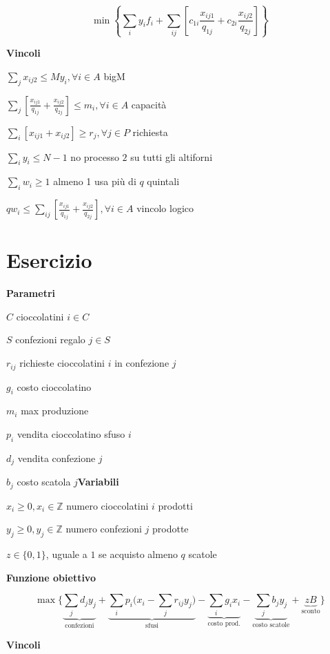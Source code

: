 \documentclass[10pt,a4paper,twoside,openright]{book}
\newcounter{es}
\newcommand{\Es}{
	\stepcounter{es}
	\section{Esercizio \arabic{es}}
	}
\newcommand{\Par}{\textbf{Parametri}}
\newcommand{\Var}{\textbf{Variabili}}
\newcommand{\Fob}{\textbf{Funzione obiettivo}}
\newcommand{\Vin}{\textbf{Vincoli}}
\begin{document}
\begin{equation*}
	\min \left\{\sum _{i} y_{i} f_{i} +\sum _{ij}\left[ c_{1i}\frac{x_{ij1}}{q_{1j}} +c_{2i}\frac{x_{ij2}}{q_{2j}}\right]\right\}
\end{equation*}

\Vin

$\sum _{j} x_{ij2} \leq My_{i} ,\forall i\in A$ bigM

$\sum _{j}\left[\frac{x_{ij1}}{q_{1j}} +\frac{x_{ij2}}{q_{2j}}\right] \leq m_{i} ,\forall i\in A$ capacità

$\sum _{i}[ x_{ij1} +x_{ij2}] \geqslant r_{j} ,\forall j\in P$ richiesta

$\sum _{i} y_{i} \leq N-1$ no processo $2$ su tutti gli altiforni

$\sum _{i} w_{i} \geqslant 1$ almeno 1 usa più di $q$ quintali

$qw_{i} \leq \sum _{ij}\left[\frac{x_{ij1}}{q_{1j}} +\frac{x_{ij2}}{q_{2j}}\right] ,\forall i\in A$ vincolo logico

\Es

\Par

$C$ cioccolatini $i\in C$

$S$ confezioni regalo $j\in S$

$r_{ij}$ richieste cioccolatini $i$ in confezione $j$

$g_{i}$ costo cioccolatino

$m_{i}$ max produzione

$p_{i}$ vendita cioccolatino sfuso $i$

$d_{j}$ vendita confezione $j$

$b_{j}$ costo scatola $j$\Var

$x_{i} \geqslant 0,x_{i} \in \mathbb{Z}$ numero cioccolatini $i$ prodotti

$y_{j} \geqslant 0,y_{j} \in \mathbb{Z}$ numero confezioni $j$ prodotte

$z\in \{0,1\}$, uguale a $1$ se acquisto almeno $q$ scatole

\Fob

\begin{equation*}
	\max\bigg\{\underbrace{\sum _{j} d_{j} y_{j}}_{\text{confezioni}} +\underbrace{\sum _{i} p_{i}\bigg( x_{i} -\sum _{j} r_{ij} y_{j}\bigg)}_{\text{sfusi}} -\underbrace{\sum _{i} g_{i} x_{i}}_{\text{costo prod.}} -\underbrace{\sum _{j} b_{j} y_{j}}_{\text{costo scatole}} +\underbrace{zB}_{\text{sconto}}\bigg\}
\end{equation*}

\Vin
\end{document}
